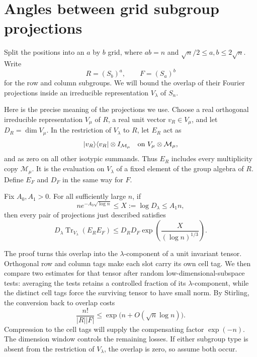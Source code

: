 \section{Angles between grid subgroup projections}
\label{ten:lowplanes:part:189}

Split the positions into an \(a\) by \(b\) grid, where \(ab=n\) and
\(\sqrt n/2\le a,b\le2\sqrt n\).  Write
\[
 R=(S_b)^a,\qquad F=(S_a)^b
\]
for the row and column subgroups.  We will bound the overlap of their
Fourier projections inside an irreducible representation \(V_\lambda\)
of \(S_n\).

Here is the precise meaning of the projections we use.  Choose a real
orthogonal irreducible representation \(V_\mu\) of \(R\), a real unit
vector \(v_R\in V_\mu\), and let \(D_R=\dim V_\mu\).  In the restriction
of \(V_\lambda\) to \(R\), let \(E_R\) act as
\[
 |v_R\rangle\langle v_R|\otimes I_{\mathcal M_\mu}
 \quad\hbox{on }V_\mu\otimes\mathcal M_\mu,
\]
and as zero on all other isotypic summands.  Thus \(E_R\) includes every
multiplicity copy \(\mathcal M_\mu\).  It is the evaluation on
\(V_\lambda\) of a fixed element of the group algebra of \(R\).
Define \(E_F\) and \(D_F\) in the same way for \(F\).

\begin{proposition}\label{prop:grid-overlap}
Fix \(A_0,A_1>0\).  For all sufficiently large \(n\), if
\begin{equation}
 ne^{-A_0\sqrt{\log n}}\le X:=\log D_\lambda\le A_1n,
 \label{ten:lowplanes:eq:14}
\end{equation}
then every pair of projections just described satisfies
\begin{equation}
 D_\lambda\operatorname{Tr}_{V_\lambda}(E_RE_F)
 \le D_RD_F\exp\!\left(\frac{X}{(\log n)^{1/3}}\right).
 \label{ten:lowplanes:eq:15}
\end{equation}
\end{proposition}

The proof turns this overlap into the \(\lambda\)-component of a unit
invariant tensor.  Orthogonal row and column tags make each slot carry
its own cell tag.  We then compare two estimates for that tensor after
random low-dimensional-subspace tests: averaging the tests retains a
controlled fraction of its \(\lambda\)-component, while the distinct
cell tags force the surviving tensor to have small norm.  By Stirling,
the conversion back to overlap costs
\begin{equation}\label{eq:grid-normalization-cost}
 \frac{n!}{|R||F|}
 \le \exp\!\bigl(n+O(\sqrt n\log n)\bigr).
\end{equation}
Compression to the cell tags will supply the compensating factor
\(\exp(-n)\).  The dimension window controls the remaining losses.
If either subgroup type is absent from the restriction of \(V_\lambda\),
the overlap is zero, so assume both occur.


